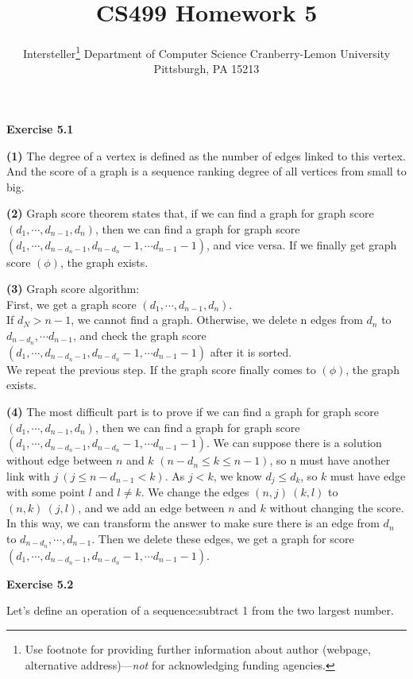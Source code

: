 \documentclass{article} %
\title{CS499 Homework 5 }
\author{
	Intersteller\thanks{ Use footnote for providing further information
		about author (webpage, alternative address)---\emph{not} for acknowledging
		funding agencies.}
	Department of Computer Science
	Cranberry-Lemon University
	Pittsburgh, PA 15213
}
\begin{document}
	\maketitle
	\textbf{Exercise 5.1}\par

\textbf{(1)} The degree of a vertex is defined as the number of edges linked to this vertex. And the score of a graph is a sequence ranking degree of all vertices from small to big.\par

\textbf{(2)} Graph score theorem states that, if we can find a graph for graph score $(d_1, \cdots ,d_{n-1},d_n)$, then we can find a graph for graph score $(d_1, \cdots ,d_{n-d_n-1},d_{n-d_n}-1,\cdots d_{n-1}-1)$, and vice versa. If we finally get graph score $(\phi)$, the graph exists.\par

\textbf{(3)} Graph score algorithm:\\
First, we get a graph score $(d_1, \cdots ,d_{n-1},d_n)$.\\
If $d_N>n-1$, we cannot find a graph. Otherwise, we delete n edges from $d_n$ to $d_{n-d_n},\cdots d_{n-1}$, and check the graph score $(d_1, \cdots ,d_{n-d_n-1},d_{n-d_n}-1,\cdots d_{n-1}-1)$ after it is sorted.\\
We repeat the previous step. If the graph score finally comes to $(\phi)$, the graph exists.\par

\textbf{(4)} The most difficult part is to prove if we can find a graph for graph score $(d_1, \cdots ,d_{n-1},d_n)$, then we can find a graph for graph score $(d_1, \cdots ,d_{n-d_n-1},d_{n-d_n}-1,\cdots d_{n-1}-1)$. We can suppose there is a solution without edge between $n$ and $k$ $(n-d_n\leq k\leq n-1)$, so n must have another link with $j \ (j\leq n-d_{n-1}<k)$. As $j<k$, we know $d_j\leq d_k$, so $k$ must have edge with some point $l$ and $l\neq k$. We change the edges $(n,j)\  (k,l)$ to $(n,k)\  (j,l)$, and we add an edge between $n$ and $k$ without changing the score. In this way, we can transform the answer to make sure there is an edge from $d_n$ to $d_{n-d_n},\cdots ,d_{n-1}$. Then we delete these edges, we get a graph for score $(d_1, \cdots ,d_{n-d_n-1},d_{n-d_n}-1,\cdots d_{n-1}-1)$.\par

\textbf{Exercise 5.2}\par
	Let's define an operation of a sequence:subtract 1 from the two largest number. \par
\end{document}
